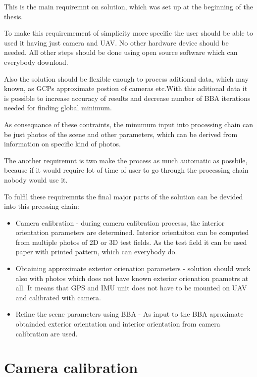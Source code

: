 \documentclass[a4paper,12pt]{report}
\begin{document}
This is the main requiremnt on solution, which was set up at the beginning of the thesis.

To make this requiremement of simplicity more specific the user should be able to used it having 
just camera and UAV. No other hardware device should be needed. All other steps should be done 
using open source software which can everybody download.

Also the solution should be flexible enough to process aditional data, which may known, 
as GCPs approximate postion of cameras etc.With this aditional data it is possible 
to increase accuracy of results and decrease number of  BBA iterations needed for finding 
global minimum.

As consequance of these contraints, the minumum input into processing chain can be just photos
of the scene and other parameters, which can be derived from information on specific kind of photos.

The another requiremnt is two make the process as much automatic as possbile, because if it would require 
lot of time of user to go through the processing chain nobody would use it.

To fulfil these requiremnts the final major parts of the solution can be devided into this prcessing chain:

\begin{itemize}
\item Camera calibration - during camera calibration processs, the interior orientation parameters 
			   are determined.
		             Interior orientaiton can be computed 
			     from multiple photos of 2D or 3D test fields. As the test field it can be used 
			     paper with printed pattern, which can everybody do. 
				
\item Obtaining approximate exterior orienation parameters - solution should work also with photos 
which does not have known exterior orienation paametrs at all. It means 
that GPS and IMU unit does not have to be mounted on UAV and calibrated with camera.
  

\item Refine the scene parameters using BBA - As input to the BBA aproximate obtainded exterior orientation
and interior orientation from camera calibration are used.

\end{itemize}

\section{Camera calibration}
\end{document}
